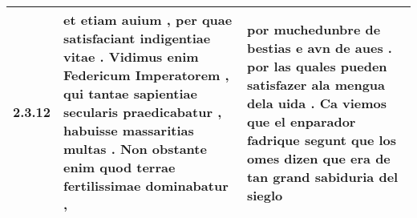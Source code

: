 \begin{tabular}{|p{1cm}|p{6.5cm}|p{6.5cm}|}

\hline
2.3.12 & et etiam auium , per quae satisfaciant indigentiae vitae . \textbf{ Vidimus enim Federicum Imperatorem , } qui tantae sapientiae secularis praedicabatur , habuisse massaritias multas . Non obstante enim quod terrae fertilissimae dominabatur , & por muchedunbre de bestias e avn de aues . por las quales pueden satisfazer ala mengua dela uida . \textbf{ Ca viemos que el enparador fadrique } segunt que los omes dizen que era de tan grand sabiduria del sieglo \\\hline

\end{tabular}
